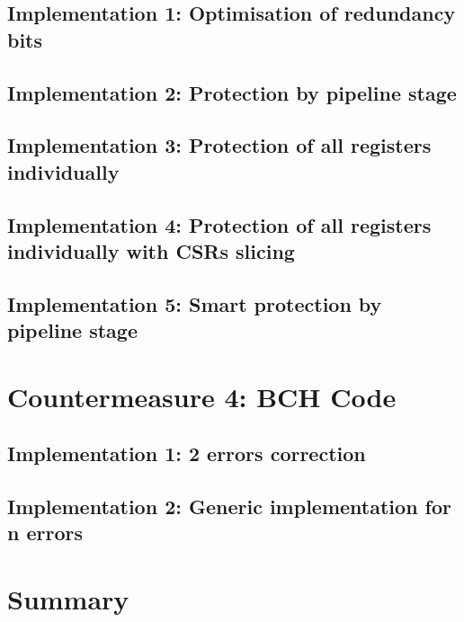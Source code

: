     \subsection{Implementation 1: Optimisation of redundancy bits}

    \subsection{Implementation 2: Protection by pipeline stage}

    \subsection{Implementation 3: Protection of all registers individually}

    \subsection{Implementation 4: Protection of all registers individually with CSRs slicing}

    \subsection{Implementation 5: Smart protection by pipeline stage}

\section{Countermeasure 4: BCH Code}

    \subsection{Implementation 1: 2 errors correction}

    \subsection{Implementation 2: Generic implementation for n errors}

\section{Summary}

